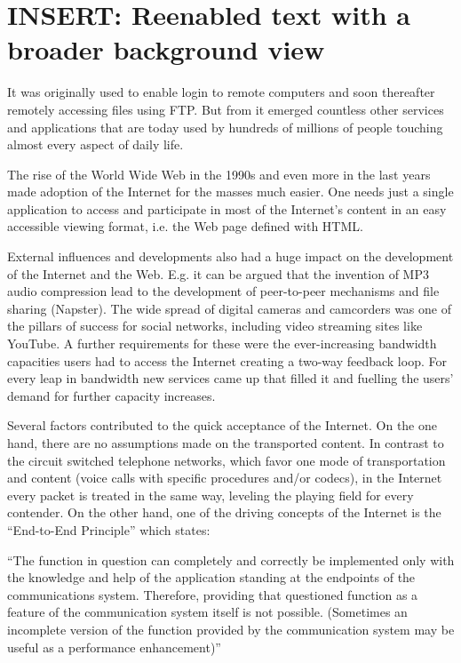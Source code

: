 \section{INSERT: Reenabled text with a broader background view}

It was originally used to enable login to remote computers and soon thereafter remotely accessing files using FTP. But from it emerged countless other services and applications that are today used by hundreds of millions of people touching almost every aspect of daily life. 

The rise of the World Wide Web in the 1990s and even more in the last years made adoption of the Internet for the masses much easier. One needs just a single application to access and participate in most of the Internet's content in an easy accessible viewing format, i.e. the Web page defined with HTML.

External influences and developments also had a huge impact on the development of the Internet and the Web. E.g. it can be argued that the invention of MP3 audio compression lead to the development of peer-to-peer mechanisms and file sharing (Napster). The wide spread of digital cameras and camcorders was one of the pillars of success for social networks, including video streaming sites like YouTube.
A further requirements for these were the ever-increasing bandwidth capacities users had to access the Internet creating a two-way feedback loop. For every leap in bandwidth new services came up that filled it and fuelling the users' demand for further capacity increases. 

Several factors contributed to the quick acceptance of the Internet. On the one hand, there are no assumptions made on the transported content. In contrast to the circuit switched telephone networks, which favor one mode of transportation and content (voice calls with specific procedures and/or codecs), in the Internet every packet is treated in the same way, leveling the playing field for every contender. On the other hand, one of the driving concepts of the Internet is the ``End-to-End Principle'' \cite{saltzer1984end2end, bhattacharjee1997active, blumenthal2001rethinking, isenberg1997rise, lemley2000end} which states:

``The function in question can completely and correctly be implemented only with the knowledge and help of the application standing at the endpoints of the communications system. Therefore, providing that questioned function as a feature of the communication system itself is not possible. (Sometimes an incomplete version of the function provided by the communication system may be useful as a performance enhancement)'' \cite{saltzer1984end2end} 

